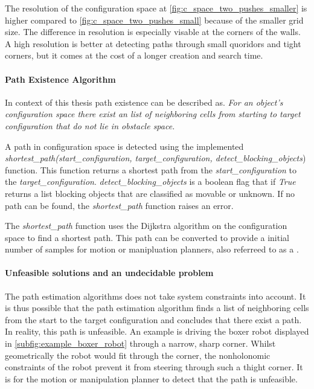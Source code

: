 The resolution of the configuration space at \cref{fig:c_space_two_pushes_smaller} is higher compared to \cref{fig:c_space_two_pushes_small} because of the smaller grid size. The difference in resolution is especially visable at the corners of the walls. A high resolution is better at detecting paths through small quoridors and tight corners, but it comes at the cost of a longer creation and search time.

\paragraph{Path Existence Algorithm}
In context of this thesis path existence can be described as. \textit{For an object's configuration space there exist an list of neighboring cells from starting to target configuration that do not lie in obstacle space.\bs}

A path in configuration space is detected using the implemented \textit{shortest\_path(start\_configuration, target\_configuration, detect\_blocking\_objects}) function. This function returns a shortest path from the \textit{start\_configuration} to the \textit{target\_configuration}. \textit{detect\_blocking\_objects} is a boolean flag that if \textit{True} returns a list blocking objects that are classified as movable or unknown. If no path can be found, the \textit{shortest\_path} function raises an error.\bs

The \textit{shortest\_path} function uses the Dijkstra algorithm 
\cite{dijkstra_note_1959} on the configuration space to find a shortest path. This path can be converted to provide a initial number of samples for motion or manipluation planners, also referreed to as a .

\paragraph{Unfeasible solutions and an undecidable problem}
The path estimation algorithms does not take system constraints into account. It is thus possible that the path estimation algorithm finds a list of neighboring cells from the start to the target configuration and concludes that there exist a path. In reality, this path is unfeasible. An example is driving the boxer robot displayed in \cref{subfig:example_boxer_robot} through a narrow, sharp corner. Whilst geometrically the robot would fit through the corner, the nonholonomic constraints of the robot prevent it from steering through such a thight corner. It is for the motion or manipulation planner to detect that the path is unfeasible.\\

